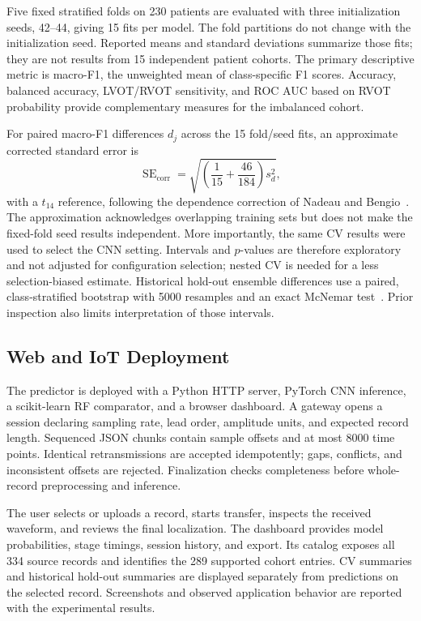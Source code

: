 \documentclass[conference,a4paper]{IEEEtran}
\begin{document}
Five fixed stratified folds on 230 patients are evaluated with three initialization seeds, 42--44, giving 15 fits per model. The fold partitions do not change with the initialization seed. Reported means and standard deviations summarize those fits; they are not results from 15 independent patient cohorts. The primary descriptive metric is macro-F1, the unweighted mean of class-specific F1 scores. Accuracy, balanced accuracy, LVOT/RVOT sensitivity, and ROC AUC based on RVOT probability provide complementary measures for the imbalanced cohort.

For paired macro-F1 differences $d_j$ across the 15 fold/seed fits, an approximate corrected standard error is
\begin{equation}
\operatorname{SE}_{\mathrm{corr}}=\sqrt{\left(\frac{1}{15}+\frac{46}{184}\right)s_d^2},
\label{eq:se}
\end{equation}
with a $t_{14}$ reference, following the dependence correction of Nadeau and Bengio~\cite{nadeau2003}. The approximation acknowledges overlapping training sets but does not make the fixed-fold seed results independent. More importantly, the same CV results were used to select the CNN setting. Intervals and $p$-values are therefore exploratory and not adjusted for configuration selection; nested CV is needed for a less selection-biased estimate. Historical hold-out ensemble differences use a paired, class-stratified bootstrap with 5000 resamples and an exact McNemar test~\cite{mcnemar1947}. Prior inspection also limits interpretation of those intervals.

\subsection{Web and IoT Deployment}
The predictor is deployed with a Python HTTP server, PyTorch CNN inference, a scikit-learn RF comparator, and a browser dashboard. A gateway opens a session declaring sampling rate, lead order, amplitude units, and expected record length. Sequenced JSON chunks contain sample offsets and at most 8000 time points. Identical retransmissions are accepted idempotently; gaps, conflicts, and inconsistent offsets are rejected. Finalization checks completeness before whole-record preprocessing and inference.

The user selects or uploads a record, starts transfer, inspects the received waveform, and reviews the final localization. The dashboard provides model probabilities, stage timings, session history, and export. Its catalog exposes all 334 source records and identifies the 289 supported cohort entries. CV summaries and historical hold-out summaries are displayed separately from predictions on the selected record. Screenshots and observed application behavior are reported with the experimental results.
\end{document}

